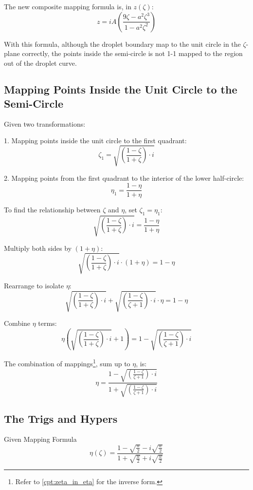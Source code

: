 The new composite mapping formula is, in $z(\zeta)$:
\[
z = i A \left( \frac{9\zeta  - a^2\zeta ^3}{1 - a^2\zeta ^2} \right)
\]

With this formula, although the droplet boundary map to the unit circle in the \(\zeta\)-plane correctly, the points inside the semi-circle is not 1-1 mapped to the region out of the droplet curve. 

\subsection{Mapping Points Inside the Unit Circle to the Semi-Circle}\label{cpt:maps_combine}
Given two transformations:

1. Mapping points inside the unit circle to the first quadrant:
   \[
   \zeta_1 = \sqrt{\left( \frac{1 - \zeta}{1 + \zeta} \right) \cdot i}
   \]

2. Mapping points from the first quadrant to the interior of the lower half-circle:
   \[
   \eta_1 = \frac{1 - \eta}{1 + \eta}
   \]

To find the relationship between \(\zeta\) and \(\eta\), set \(\zeta_1 = \eta_1\):
\[
\sqrt{\left( \frac{1 - \zeta}{1 + \zeta} \right) \cdot i} = \frac{1 - \eta}{1 + \eta}
\]

Multiply both sides by \((1 + \eta)\):
\[
\sqrt{\left( \frac{1 - \zeta}{1 + \zeta} \right) \cdot i} \cdot (1 + \eta) = 1 - \eta
\]

Rearrange to isolate \(\eta\):
\[
\sqrt{\left( \frac{1 - \zeta}{1 + \zeta} \right) \cdot i} + \sqrt{\left( \frac{1 - \zeta}{\zeta + 1} \right) \cdot i} \cdot \eta = 1 - \eta
\]

Combine \(\eta\) terms:
\[
\eta \left( \sqrt{\left( \frac{1 - \zeta}{1 + \zeta} \right) \cdot i} + 1 \right) = 1 - \sqrt{\left( \frac{1 - \zeta}{\zeta + 1} \right) \cdot i}
\]

The combination of mappings\footnote{Refer to \ref{cpt:zeta_in_eta} for the inverse form.}, sum up to \(\eta\), is:
\[
\eta = \frac{1 - \sqrt{\left( \frac{1 - \zeta}{\zeta + 1} \right) \cdot i}}{1 + \sqrt{\left( \frac{1 - \zeta}{\zeta + 1} \right) \cdot i}}
\]

\subsection{The Trigs and Hypers}\label{cpt:hyper}
Given Mapping Formula
\[
\eta(\zeta) = \frac{1 - \sqrt{\frac{w}{2}} - i \sqrt{\frac{w}{2}}}{1 + \sqrt{\frac{w}{2}} + i \sqrt{\frac{w}{2}}}
\]

